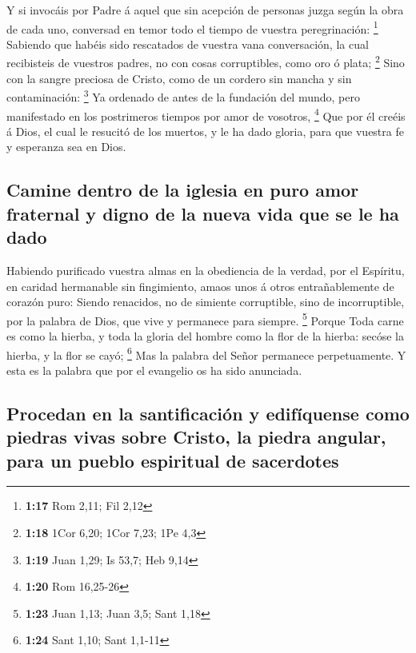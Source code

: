  Y si invocáis por Padre á aquel que sin acepción de
personas juzga según la obra de cada uno, conversad en temor todo el
tiempo de vuestra peregrinación: \footnote{\textbf{1:17} Rom 2,11; Fil
  2,12}  Sabiendo que habéis sido rescatados de vuestra
vana conversación, la cual recibisteis de vuestros padres, no con cosas
corruptibles, como oro ó plata; \footnote{\textbf{1:18} 1Cor 6,20; 1Cor
  7,23; 1Pe 4,3}  Sino con la sangre preciosa de Cristo,
como de un cordero sin mancha y sin contaminación: \footnote{\textbf{1:19}
  Juan 1,29; Is 53,7; Heb 9,14}  Ya ordenado de antes de la
fundación del mundo, pero manifestado en los postrimeros tiempos por
amor de vosotros, \footnote{\textbf{1:20} Rom 16,25-26} 
Que por él creéis á Dios, el cual le resucitó de los muertos, y le ha
dado gloria, para que vuestra fe y esperanza sea en Dios.

\hypertarget{camine-dentro-de-la-iglesia-en-puro-amor-fraternal-y-digno-de-la-nueva-vida-que-se-le-ha-dado}{%
\subsection{Camine dentro de la iglesia en puro amor fraternal y digno
de la nueva vida que se le ha
dado}\label{camine-dentro-de-la-iglesia-en-puro-amor-fraternal-y-digno-de-la-nueva-vida-que-se-le-ha-dado}}

 Habiendo purificado vuestra almas en la obediencia de la
verdad, por el Espíritu, en caridad hermanable sin fingimiento, amaos
unos á otros entrañablemente de corazón puro:  Siendo
renacidos, no de simiente corruptible, sino de incorruptible, por la
palabra de Dios, que vive y permanece para siempre. \footnote{\textbf{1:23}
  Juan 1,13; Juan 3,5; Sant 1,18}  Porque Toda carne es
como la hierba, y toda la gloria del hombre como la flor de la hierba:
secóse la hierba, y la flor se cayó; \footnote{\textbf{1:24} Sant 1,10;
  Sant 1,1-11}  Mas la palabra del Señor permanece
perpetuamente. Y esta es la palabra que por el evangelio os ha sido
anunciada.

\hypertarget{procedan-en-la-santificaciuxf3n-y-edifuxedquense-como-piedras-vivas-sobre-cristo-la-piedra-angular-para-un-pueblo-espiritual-de-sacerdotes}{%
\subsection{Procedan en la santificación y edifíquense como piedras
vivas sobre Cristo, la piedra angular, para un pueblo espiritual de
sacerdotes}\label{procedan-en-la-santificaciuxf3n-y-edifuxedquense-como-piedras-vivas-sobre-cristo-la-piedra-angular-para-un-pueblo-espiritual-de-sacerdotes}}

